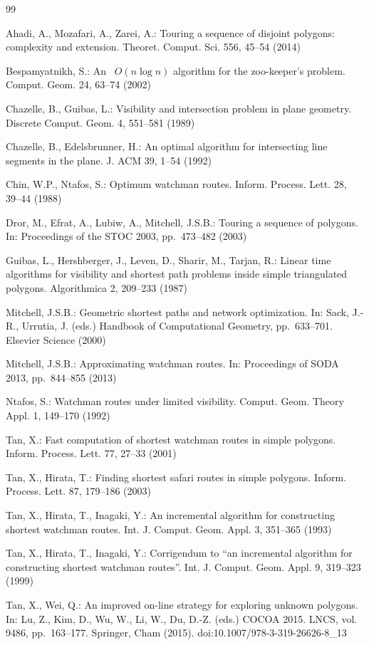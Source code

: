 \documentclass[11pt]{article}
\begin{document}
\begin{thebibliography}{99}

 Ahadi, A., Mozafari, A., Zarei, A.: Touring a sequence of disjoint polygons: complexity and extension. Theoret. Comput. Sci. 556, 45--54 (2014)

 Bespamyatnikh, S.: An ~\(O(n\log n)\) algorithm for the zoo-keeper's problem. Comput. Geom. 24, 63--74 (2002)

 Chazelle, B., Guibas, L.: Visibility and intersection problem in plane geometry. Discrete Comput. Geom. 4, 551--581 (1989)

 Chazelle, B., Edelsbrunner, H.: An optimal algorithm for intersecting line segments in the plane. J. ACM 39, 1--54 (1992)

 Chin, W.P., Ntafos, S.: Optimum watchman routes. Inform. Process. Lett. 28, 39--44 (1988)

 Dror, M., Efrat, A., Lubiw, A., Mitchell, J.S.B.: Touring a sequence of polygons. In: Proceedings of the STOC 2003, pp.\ 473--482 (2003)

 Guibas, L., Hershberger, J., Leven, D., Sharir, M., Tarjan, R.: Linear time algorithms for visibility and shortest path problems inside simple triangulated polygons. Algorithmica 2, 209--233 (1987)

 Mitchell, J.S.B.: Geometric shortest paths and network optimization. In: Sack, J.-R., Urrutia, J. (eds.) Handbook of Computational Geometry, pp.\ 633--701. Elsevier Science (2000)

 Mitchell, J.S.B.: Approximating watchman routes. In: Proceedings of SODA 2013, pp.\ 844--855 (2013)

 Ntafos, S.: Watchman routes under limited visibility. Comput. Geom. Theory Appl. 1, 149--170 (1992)

 Tan, X.: Fast computation of shortest watchman routes in simple polygons. Inform. Process. Lett. 77, 27--33 (2001)

 Tan, X., Hirata, T.: Finding shortest safari routes in simple polygons. Inform. Process. Lett. 87, 179--186 (2003)

 Tan, X., Hirata, T., Inagaki, Y.: An incremental algorithm for constructing shortest watchman routes. Int. J. Comput. Geom. Appl. 3, 351--365 (1993)

 Tan, X., Hirata, T., Inagaki, Y.: Corrigendum to ``an incremental algorithm for constructing shortest watchman routes''. Int. J. Comput. Geom. Appl. 9, 319--323 (1999)

 Tan, X., Wei, Q.: An improved on-line strategy for exploring unknown polygons. In: Lu, Z., Kim, D., Wu, W., Li, W., Du, D.-Z. (eds.) COCOA 2015. LNCS, vol. 9486, pp.\ 163--177. Springer, Cham (2015). doi:10.1007/978-3-319-26626-8\_13

\end{thebibliography}
\end{document}
